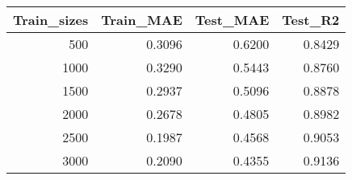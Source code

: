\begin{tabular}{rrrr}
\toprule
Train_sizes & Train_MAE & Test_MAE & Test_R2 \\
\midrule
500 & 0.3096 & 0.6200 & 0.8429 \\
1000 & 0.3290 & 0.5443 & 0.8760 \\
1500 & 0.2937 & 0.5096 & 0.8878 \\
2000 & 0.2678 & 0.4805 & 0.8982 \\
2500 & 0.1987 & 0.4568 & 0.9053 \\
3000 & 0.2090 & 0.4355 & 0.9136 \\
\bottomrule
\end{tabular}
